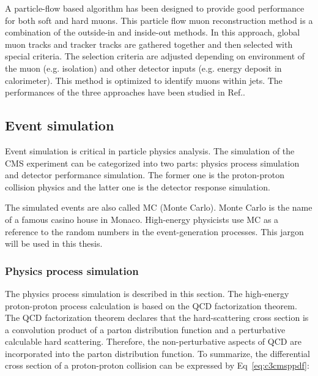 A particle-flow based algorithm has been designed to provide good performance for both soft and hard muons. This particle flow muon reconstruction method is a combination of the outside-in and inside-out methods. In this approach, global muon tracks and tracker tracks are gathered together and then selected with special criteria. The selection criteria are adjusted depending on environment of the muon (e.g. isolation) and other detector inputs (e.g. energy deposit in calorimeter). This method is optimized to identify muons within jets. The performances of the three approaches have been studied in Ref.\cite{Chatrchyan:2012xi}. 

\clearpage
\subsection{Event simulation}
Event simulation is critical in particle physics analysis. The simulation of the CMS experiment can be categorized into two parts: physics process simulation and detector performance simulation. The former one is the proton-proton collision physics and the latter one is the detector response simulation. 

The simulated events are also called MC (Monte Carlo). Monte Carlo is the name of a famous casino house in Monaco. High-energy physicists use MC as a reference to the random numbers in the event-generation processes. This jargon will be used in this thesis. 

\subsubsection{Physics process simulation}

The physics process simulation is described in this section. The high-energy proton-proton process calculation is based on the QCD factorization theorem\cite{Collins:1989gx}. The QCD factorization theorem declares that the hard-scattering cross section is a convolution product of a parton distribution function and a perturbative calculable hard scattering. Therefore, the non-perturbative aspects of QCD are incorporated into the parton distribution function. To summarize, the differential cross section of a proton-proton collision can be expressed by Eq~\ref{eq:c3cmsppdf}:


